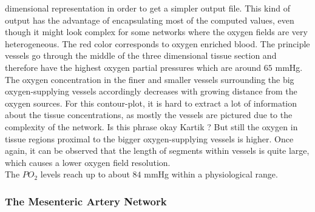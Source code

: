 dimensional representation in order to get a simpler output file. This kind of output has the advantage of encapsulating most of the computed values, even though it might look complex for some networks where the oxygen fields are very heterogeneous. The red color corresponds to oxygen enriched blood. The principle vessels go through the middle of the three dimensional tissue section and therefore have the highest oxygen partial pressures which are around $65$ mmHg. The oxygen concentration in the finer and smaller vessels surrounding the big oxygen-supplying vessels accordingly decreases with growing distance from the oxygen sources. {\color{red}For this contour-plot, it is hard to extract a lot of information about the tissue concentrations, as mostly the vessels are pictured due to the complexity of the network. Is this phrase okay Kartik ?}
But still the oxygen in tissue regions proximal to the bigger oxygen-supplying vessels is higher. Once again, it can be observed that the length of segments within vessels is quite large, which causes a lower oxygen field resolution.
\\The $PO_2$ levels reach up to about $84$ mmHg within a physiological range.

\newpage
\subsubsection*{The Mesenteric Artery Network}
\label{Mesent}

